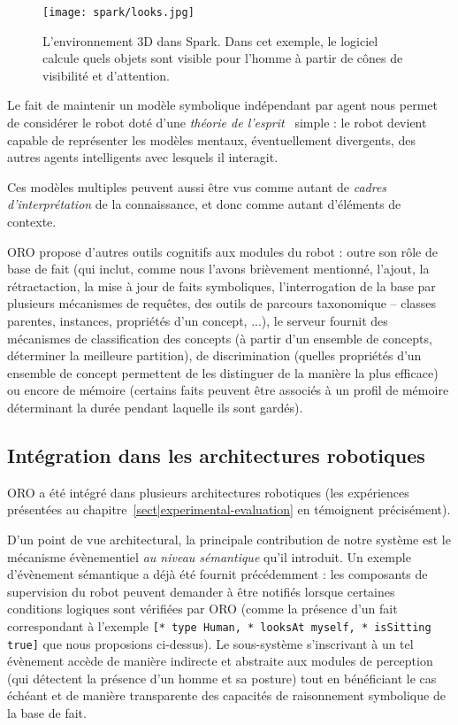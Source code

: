 \begin{figure}
\centering
  \texttt{[image: spark/looks.jpg]}

  \caption{L'environnement 3D dans {\sc Spark}. Dans cet exemple, le logiciel
  calcule quels objets sont visible pour l'homme à partir de cônes de
  visibilité et d'attention.}

  \label{fig|spark}
\end{figure}

Le fait de maintenir un modèle symbolique indépendant par agent nous permet de
considérer le robot doté d'une \emph{théorie de l'esprit}~\cite{Leslie2000}
simple : le robot devient capable de représenter les modèles mentaux,
éventuellement divergents, des autres agents intelligents avec lesquels il
interagit.

Ces modèles multiples peuvent aussi être vus comme autant de \emph{cadres
d'interprétation} de la connaissance, et donc comme autant d'éléments de
contexte.

ORO propose d'autres outils cognitifs aux modules du robot : outre son rôle de
base de fait (qui inclut, comme nous l'avons brièvement mentionné, l'ajout, la
rétractaction, la mise à jour de faits symboliques, l'interrogation de la base
par plusieurs mécanismes de requêtes, des outils de parcours taxonomique --
classes parentes, instances, propriétés d'un concept, ...), le serveur fournit
des mécanismes de classification des concepts (à partir d'un ensemble de
concepts, déterminer la meilleure partition), de discrimination (quelles
propriétés d'un ensemble de concept permettent de les distinguer de la manière
la plus efficace) ou encore de mémoire (certains faits peuvent être associés à
un profil de mémoire déterminant la durée pendant laquelle ils sont gardés).

\subsection*{Intégration dans les architectures robotiques}

ORO a été intégré dans plusieurs architectures robotiques (les expériences
présentées au chapitre~\ref{sect|experimental-evaluation} en témoignent
précisément).

D'un point de vue architectural, la principale contribution de notre système
est le mécanisme évènementiel \emph{au niveau sémantique} qu'il introduit. Un
exemple d'évènement sémantique a déjà été fournit précédemment : les composants
de supervision du robot peuvent demander à être notifiés lorsque certaines
conditions logiques sont vérifiées par ORO (comme la présence d'un fait
correspondant à l'exemple {\tt [* type Human, * looksAt myself, * isSitting
true]} que nous proposions ci-dessus). Le sous-système s'inscrivant à un tel
évènement accède de manière indirecte et abstraite aux modules de perception
(qui détectent la présence d'un homme et sa posture) tout en bénéficiant le cas
échéant et de manière transparente des capacités de raisonnement symbolique de
la base de fait.

